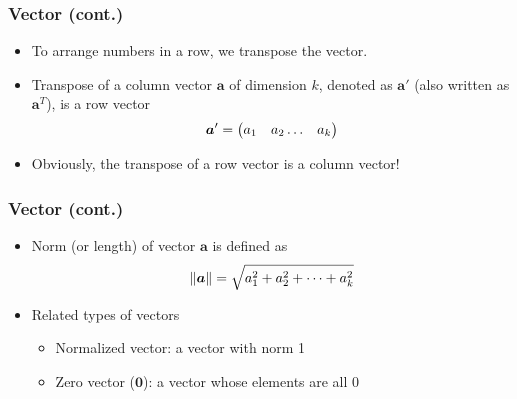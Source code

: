 \documentclass[pdflatex, 12pt]{beamer}
\begin{document}
\begin{frame}
\frametitle{Vector (cont.)}
\begin{itemize}
\item To arrange numbers in a row, we {\color{red} transpose} the vector.
\vspace{0.4cm}
\item Transpose of a column vector $\bm{a}$ of dimension $k$, denoted as $\bm{a}'$ (also written as $\bm{a}^T$), is a row vector
 \begin{equation}
 \bm{a}' = \begin{pmatrix}
 a_1 & a_2 \ldots & a_k \\
 \end{pmatrix} \notag
 \end{equation}
\item Obviously, the transpose of a row vector is a column vector!
\end{itemize}
\end{frame}

\begin{frame}
\frametitle{Vector (cont.)}
\begin{itemize}
\item {\color{red} Norm} (or length) of vector $\bm{a}$ is defined as 
 \begin{equation}
 \|\bm{a}\| = \sqrt{a_1^2 + a_2^2 + \cdots + a_k^2} \notag
 \end{equation}
\item Related types of vectors
 \begin{itemize}
 \item Normalized vector: a vector with norm 1
 \item Zero vector ($\bm{0}$): a vector whose elements are all 0
 \end{itemize}
\end{itemize}
\end{frame}
\end{document}
